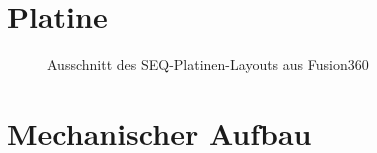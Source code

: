 \section{Platine}
\begin{figure}[h]
	\centering
	\setlength{\fboxsep}{1pt} %
	\setlength{\fboxrule}{1pt} %
	\caption{Ausschnitt des SEQ-Platinen-Layouts aus Fusion360}
	\label{fig:PCB_SEQ}
\end{figure}
\FloatBarrier
 
\section{Mechanischer Aufbau}
